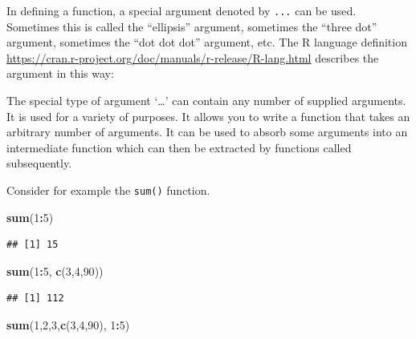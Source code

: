 \documentclass[
]{krantz}
\newenvironment{Shaded}{\begin{snugshade}}{\end{snugshade}}
\newcommand{\DecValTok}[1]{\textcolor[rgb]{0.00,0.00,0.81}{#1}}
\newcommand{\KeywordTok}[1]{\textcolor[rgb]{0.13,0.29,0.53}{\textbf{#1}}}
\newcommand{\NormalTok}[1]{#1}
\newcommand{\OperatorTok}[1]{\textcolor[rgb]{0.81,0.36,0.00}{\textbf{#1}}}
\renewenvironment{quote}{\begin{VF}}{\end{VF}}
\begin{document}
In defining a function, a special argument denoted by \texttt{...} can be used. Sometimes this is called the ``ellipsis'' argument, sometimes the ``three dot'' argument, sometimes the ``dot dot dot'' argument, etc. The R language definition \url{https://cran.r-project.org/doc/manuals/r-release/R-lang.html} describes the argument in this way:

\begin{quote}
The special type of argument `\ldots' can contain any number of supplied arguments. It is used for a variety of purposes. It allows you to write a function that takes an arbitrary number of arguments. It can be used to absorb some arguments into an intermediate function which can then be extracted by functions called subsequently.
\end{quote}

Consider for example the \texttt{sum()} function.

\begin{Shaded}
\begin{Highlighting}[]
\KeywordTok{sum}\NormalTok{(}\DecValTok{1}\OperatorTok{:}\DecValTok{5}\NormalTok{)}
\end{Highlighting}
\end{Shaded}

\begin{verbatim}
## [1] 15
\end{verbatim}

\begin{Shaded}
\begin{Highlighting}[]
\KeywordTok{sum}\NormalTok{(}\DecValTok{1}\OperatorTok{:}\DecValTok{5}\NormalTok{, }\KeywordTok{c}\NormalTok{(}\DecValTok{3}\NormalTok{,}\DecValTok{4}\NormalTok{,}\DecValTok{90}\NormalTok{))}
\end{Highlighting}
\end{Shaded}

\begin{verbatim}
## [1] 112
\end{verbatim}

\begin{Shaded}
\begin{Highlighting}[]
\KeywordTok{sum}\NormalTok{(}\DecValTok{1}\NormalTok{,}\DecValTok{2}\NormalTok{,}\DecValTok{3}\NormalTok{,}\KeywordTok{c}\NormalTok{(}\DecValTok{3}\NormalTok{,}\DecValTok{4}\NormalTok{,}\DecValTok{90}\NormalTok{), }\DecValTok{1}\OperatorTok{:}\DecValTok{5}\NormalTok{)}
\end{Highlighting}
\end{Shaded}
\end{document}
